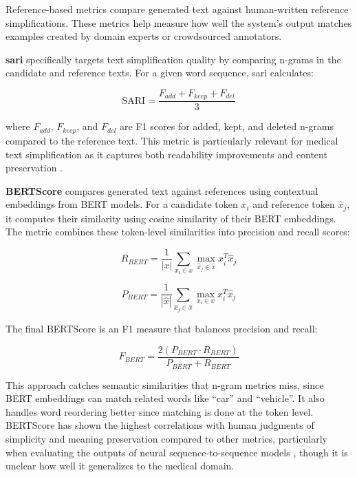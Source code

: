 Reference-based metrics compare generated text against human-written reference simplifications. 
These metrics help measure how well the system's output matches examples created by domain experts or crowdsourced annotators.

\textbf{\gls{sari}} \cite{xu-etal-2016-optimizing} specifically targets text simplification quality by comparing n-grams in the candidate and reference texts.
For a given word sequence, \gls{sari} calculates:

\begin{equation}
    \text{SARI} = \frac{F_{add} + F_{keep} + F_{del}}{3}
\end{equation}

where $F_{add}$, $F_{keep}$, and $F_{del}$ are F1 scores for added, kept, and deleted n-grams compared to the reference text. This metric is particularly relevant for medical text simplification as it captures both readability improvements and content preservation \cite{li2024largelanguagemodelsbiomedical}.

\textbf{BERTScore} \cite{zhang2020bertscoreevaluatingtextgeneration} compares generated text against references using contextual embeddings from BERT models. For a candidate token $x_i$ and reference token $\hat{x}_j$, it computes their similarity using cosine similarity of their BERT embeddings. The metric combines these token-level similarities into precision and recall scores:

\begin{equation}
    R_{BERT} = \frac{1}{|x|} \sum_{x_i \in x} \max_{\hat{x}_j \in \hat{x}} x_i^T \hat{x}_j
\end{equation}

\begin{equation}
    P_{BERT} = \frac{1}{|\hat{x}|} \sum_{\hat{x}_j \in \hat{x}} \max_{x_i \in x} x_i^T \hat{x}_j
\end{equation}

The final BERTScore is an F1 measure that balances precision and recall:

\begin{equation}
    F_{BERT} = \frac{2(P_{BERT} \cdot R_{BERT})}{P_{BERT} + R_{BERT}}
\end{equation}

This approach catches semantic similarities that n-gram metrics miss, since BERT embeddings can match related words like ``car'' and ``vehicle''. 
It also handles word reordering better since matching is done at the token level. 
BERTScore has shown the highest correlations with human judgments of simplicity and meaning preservation compared to other metrics, particularly when evaluating the outputs of neural sequence-to-sequence models \cite{alva-manchego-etal-2021-un}, though it is unclear how well it generalizes to the medical domain. 

